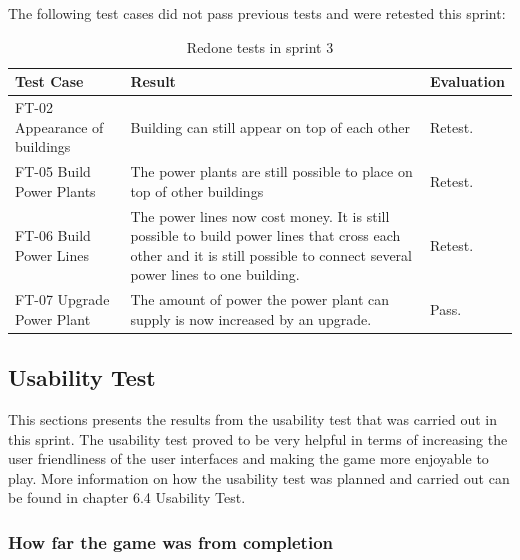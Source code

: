 	The following test cases did not pass previous tests and were retested this sprint:

	\begin{table}[H]
	\begin{tabular}{| p{3cm} | p{6.5cm} | p{2.5cm} |}
		\hline
		\rowcolor{lightgray}
		{\bf Test Case} & {\bf Result} & {\bf Evaluation} \\ \hline

		FT-02 Appearance of buildings & Building can still appear on top of each other & Retest. \\ \hline

	  	FT-05 Build Power Plants & The power plants are still possible to place on top of other buildings & Retest. \\ \hline

	  	FT-06 Build Power Lines & The power lines now cost money. It is still possible to build power lines that cross each other and it is still possible to connect several power lines to one building. & Retest. \\ \hline

	  	FT-07 Upgrade Power Plant & The amount of power the power plant can supply is now increased by an upgrade. & Pass. \\ \hline
	\end{tabular}
	\caption{Redone tests in sprint 3}
	\end{table}

\subsection{Usability Test}

	This sections presents the results from the usability test that was carried out in this sprint. The usability test proved to be very helpful in terms of increasing the user friendliness of the user interfaces and making the game more enjoyable to play. More information on how the usability test was planned and carried out can be found in chapter 6.4 Usability Test.

	\subsubsection*{How far the game was from completion}


